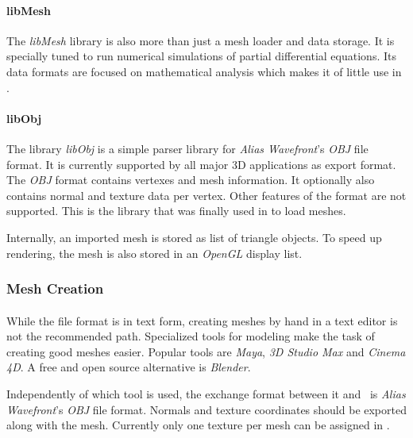 \paragraph{libMesh}
The \textit{libMesh} library is also more than just a mesh loader and data storage.
It is specially tuned to run numerical simulations of partial differential equations.
Its data formats are focused on mathematical analysis which makes it of little use in \ER.

\paragraph{libObj}
The library \textit{libObj}\cite{libobj} is a simple parser library for \textit{Alias Wavefront}'s \textit{OBJ} file format.
It is currently supported by all major 3D applications as export format.
The \textit{OBJ} format contains vertexes and mesh information.
It optionally also contains normal and texture data per vertex.
Other features of the format are not supported.
This is the library that was finally used in \ER to load meshes.

Internally, an imported mesh is stored as list of triangle objects.
To speed up rendering, the mesh is also stored in an \textit{OpenGL} display list.

\subsubsection{Mesh Creation}
\paragraph{}
While the file format is in text form, creating meshes by hand in a text editor is not the recommended path.
Specialized tools for modeling make the task of creating good meshes easier.
Popular tools are \textit{Maya}, \textit{3D Studio Max} and \textit{Cinema 4D}.
A free and open source alternative is \textit{Blender}.

Independently of which tool is used, the exchange format between it and \ER\ is \textit{Alias Wavefront}'s \textit{OBJ} file format.
Normals and texture coordinates should be exported along with the mesh.
Currently only one texture per mesh can be assigned in \ER.


